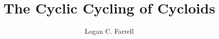 \documentclass[draft, onecolumn, letterpaper, 12pt]{ruthesis}
\title{The Cyclic Cycling of Cycloids}
\author{Logan C. Farrell}
\begin{document}
  \begin{frontmatter}
   \maketitle
   
   \tableofcontents
   \listoffigures
   \listoftables
  \end{frontmatter}


%
%






%
%
%
%
%
%
%
%

\appendix




\end{document}
